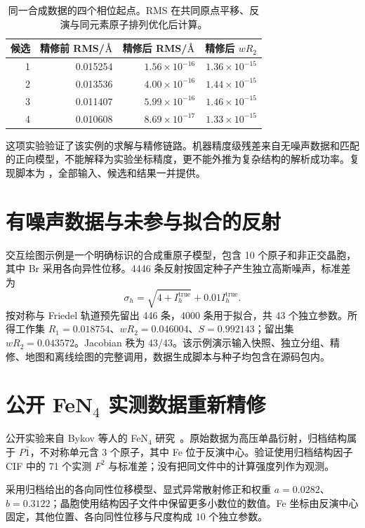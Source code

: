 \begin{table}[htbp]\centering\small
\begin{tabular}{rrrr}
\toprule 候选 & 精修前 RMS/$\text{\AA}$ & 精修后 RMS/$\text{\AA}$ & 精修后 $wR_2$\\\midrule
1&0.015254&$1.56\times10^{-16}$&$1.36\times10^{-15}$\\
2&0.013536&$4.00\times10^{-16}$&$1.44\times10^{-15}$\\
3&0.011407&$5.99\times10^{-16}$&$1.46\times10^{-15}$\\
4&0.010608&$8.69\times10^{-17}$&$1.33\times10^{-15}$\\
\bottomrule
\end{tabular}
\caption{同一合成数据的四个相位起点。RMS 在共同原点平移、反演与同元素原子排列优化后计算。}
\end{table}
这项实验验证了该实例的求解与精修链路。机器精度级残差来自无噪声数据和匹配的正向模型，不能解释为实验坐标精度，更不能外推为复杂结构的解析成功率。复现脚本为 ，全部输入、候选和结果一并提供。

\section{有噪声数据与未参与拟合的反射}
交互绘图示例是一个明确标识的合成重原子模型，包含 10 个原子和非正交晶胞，其中 Br 采用各向异性位移。4446 条反射按固定种子产生独立高斯噪声，标准差为
\begin{equation}
\sigma_h=\sqrt{4+I_h^{\mathrm{true}}}+0.01I_h^{\mathrm{true}}.
\end{equation}
按对称与 Friedel 轨道预先留出 446 条，4000 条用于拟合，共 43 个独立参数。所得工作集 $R_1=0.018754$、$wR_2=0.046004$、$S=0.992143$；留出集 $wR_2=0.043572$。Jacobian 秩为 43/43。该示例演示输入快照、独立分组、精修、地图和离线绘图的完整调用，数据生成脚本与种子均包含在源码包内。

\section{公开 \texorpdfstring{FeN$_4$}{FeN4} 实测数据重新精修}
公开实验来自 Bykov 等人的 FeN$_4$ 研究~\cite{fen4_2018}。原始数据为高压单晶衍射，归档结构属于 $P\bar1$，不对称单元含 3 个原子，其中 Fe 位于反演中心。验证使用归档结构因子 CIF 中的 71 个实测 $F^2$ 与标准差；没有把同文件中的计算强度列作为观测。

采用归档给出的各向同性位移模型、显式异常散射修正和权重 $a=0.0282$、$b=0.3122$；晶胞使用结构因子文件中保留更多小数位的数值。Fe 坐标由反演中心固定，其他位置、各向同性位移与尺度构成 10 个独立参数。

